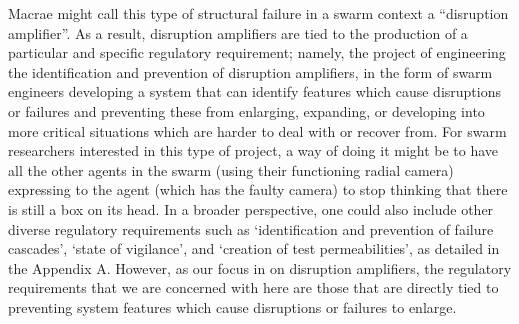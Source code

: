 \documentclass[lettersize,journal]{IEEEtran}
\begin{document}
Macrae \cite{macrae2021learning} might call this type of structural failure in a swarm context a ``disruption amplifier”.  As a result, disruption amplifiers are tied to the production of a particular and specific regulatory requirement; namely, the project of engineering the identification and prevention of disruption amplifiers, in the form of swarm engineers developing a system that can identify features which cause disruptions or failures and preventing these from enlarging, expanding, or developing into more critical situations which are harder to deal with or recover from. For swarm researchers interested in this type of project, a way of doing it might be to have all the other agents in the swarm (using their functioning radial camera) expressing to the agent (which has the faulty camera) to stop thinking that there is still a box on its head. In a broader perspective, one could also include other diverse regulatory requirements such as `identification and prevention of failure cascades’, `state of vigilance’, and `creation of test permeabilities’, as detailed in the Appendix A. However, as our focus in on disruption amplifiers, the regulatory requirements that we are concerned with here are those that are directly tied to preventing system features which cause disruptions or failures to enlarge. 
\end{document}
